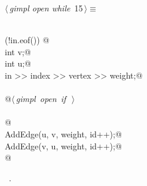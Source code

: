 \documentclass[12pt]{article}
\begin{document}
\begin{flushleft} \small
\begin{minipage}{\linewidth}\label{scrap24}\raggedright\small
{} $\langle\,${\itshape gimpl open while}\nobreak\ {\footnotesize {15}}$\,\rangle\equiv$
\vspace{-1ex}
\begin{list}{}{} \item
\mbox{}\verb@@\\
\mbox{}\verb@while (!in.eof()) {@\\
\mbox{}\verb@          int v;@\\
\mbox{}\verb@          int u;@\\
\mbox{}\verb@          in >> index >> vertex >> weight;@\\
\mbox{}\verb@@\\
\mbox{}\verb@          @\hbox{$\langle\,${\itshape gimpl open if}\nobreak\ {\footnotesize {}}$\,\rangle$}\verb@@\\
\mbox{}\verb@@\\
\mbox{}\verb@          @\\
\mbox{}\verb@          AddEdge(u, v, weight, id++);@\\
\mbox{}\verb@          AddEdge(v, u, weight, id++);@\\
\mbox{}\verb@} @\\
\mbox{}\verb@@{\NWsep}
\end{list}
\vspace{-1.5ex}
\footnotesize
\begin{list}{}{\setlength{\itemsep}{-\parsep}\setlength{\itemindent}{-\leftmargin}}
\item \NWtxtMacroRefIn\ .

\item{}
\end{list}
\end{minipage}\vspace{4ex}
\end{flushleft}
\end{document}
